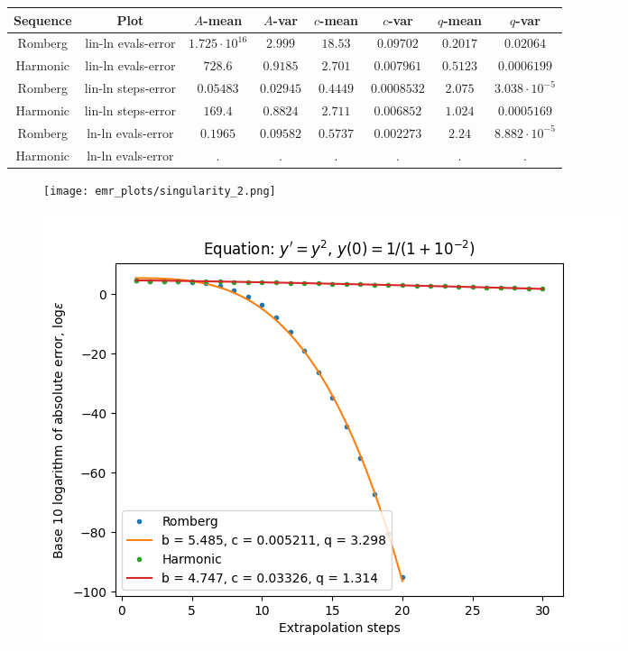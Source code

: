 \begin{table}[H]
    \centering
    \small
     \begin{tabular}{c|c||c|c|c|c|c|c}
Sequence & Plot & \(A\)-mean & \(A\)-var & \(c\)-mean & \(c\)-var & \(q\)-mean & \(q\)-var\\\hline
Romberg & lin-ln evals-error & \(1.725\cdot 10^{16}\) & \(2.999\) & \(18.53\) & \(0.09702\) & \(0.2017\) & \(0.02064\) \\
Harmonic & lin-ln evals-error & \(728.6\) & \(0.9185\) & \(2.701\) & \(0.007961\) & \(0.5123\) & \(0.0006199\) \\
Romberg & lin-ln steps-error & \(0.05483\) & \(0.02945\) & \(0.4449\) & \(0.0008532\) & \(2.075\) & \(3.038\cdot 10^{-5}\) \\
Harmonic & lin-ln steps-error & \(169.4\) & \(0.8824\) & \(2.711\) & \(0.006852\) & \(1.024\) & \(0.0005169\) \\
Romberg & ln-ln evals-error & \(0.1965\) & \(0.09582\) & \(0.5737\) & \(0.002273\) & \(2.24\) & \(8.882\cdot 10^{-5}\) \\
Harmonic & ln-ln evals-error & . & . & . & . & . & . \\
    \end{tabular}
    \label{tab:my_label}
\end{table}

\begin{figure}[H]
\centering
\begin{minipage}{0.45\textwidth}
\centering
\texttt{[image: emr\_plots/singularity\_2.png]}
\end{minipage}
\begin{minipage}{0.45\textwidth}
\centering
\includegraphics[scale=0.45]{emr_plots/singularity_2_hp_steps.png}
\end{minipage}
\end{figure}

